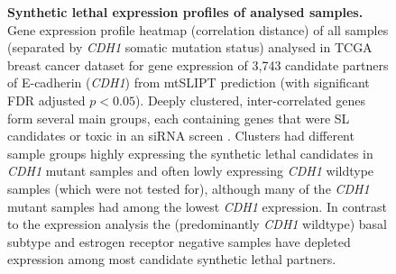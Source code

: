 \begin{figure}[!ht]
  \centering
    \caption[Synthetic lethal expression profiles of analysed samples]{\small \textbf{Synthetic lethal expression profiles of analysed samples.} Gene expression profile heatmap (correlation distance) of all samples (separated by \textit{CDH1} somatic mutation status) analysed in TCGA breast cancer dataset for gene expression of 3,743 candidate partners of E-cadherin (\textit{CDH1}) from mtSLIPT prediction (with significant FDR adjusted $p < 0.05$). Deeply clustered, inter-correlated genes form several main groups, each containing genes that were SL candidates or toxic in an siRNA screen \cite{Telford2015}. Clusters had different sample groups highly expressing the synthetic lethal candidates in \textit{CDH1} mutant samples and often lowly expressing \textit{CDH1} wildtype samples (which were not tested for), although many of the \textit{CDH1} mutant samples had among the lowest \textit{CDH1} expression. In contrast to the expression analysis the (predominantly \textit{CDH1} wildtype) basal subtype and estrogen receptor negative samples have depleted expression among most candidate synthetic lethal partners. 
}
\label{fig:slipt_expr_mtSL}
\end{figure}

